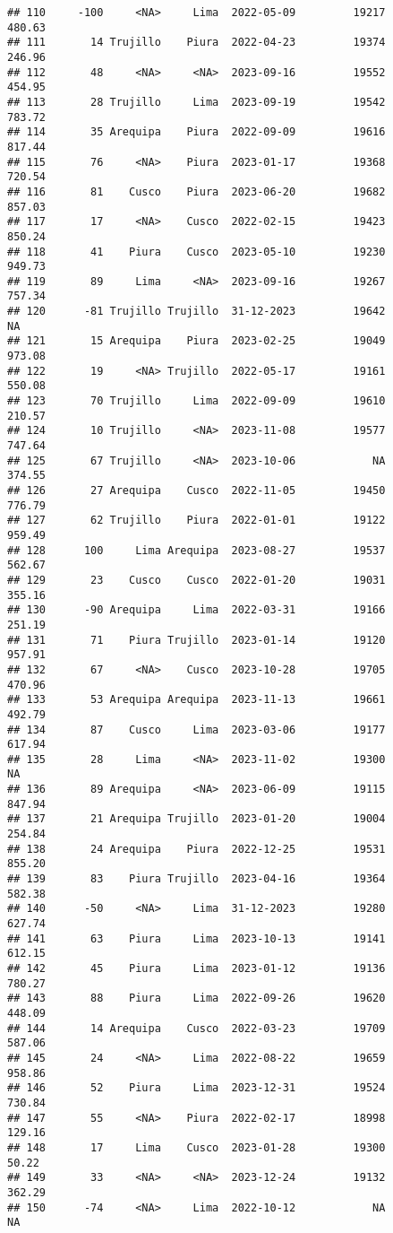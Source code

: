 \documentclass[
]{article}
\begin{document}
\begin{verbatim}
## 110     -100     <NA>     Lima  2022-05-09         19217      480.63
## 111       14 Trujillo    Piura  2022-04-23         19374      246.96
## 112       48     <NA>     <NA>  2023-09-16         19552      454.95
## 113       28 Trujillo     Lima  2023-09-19         19542      783.72
## 114       35 Arequipa    Piura  2022-09-09         19616      817.44
## 115       76     <NA>    Piura  2023-01-17         19368      720.54
## 116       81    Cusco    Piura  2023-06-20         19682      857.03
## 117       17     <NA>    Cusco  2022-02-15         19423      850.24
## 118       41    Piura    Cusco  2023-05-10         19230      949.73
## 119       89     Lima     <NA>  2023-09-16         19267      757.34
## 120      -81 Trujillo Trujillo  31-12-2023         19642          NA
## 121       15 Arequipa    Piura  2023-02-25         19049      973.08
## 122       19     <NA> Trujillo  2022-05-17         19161      550.08
## 123       70 Trujillo     Lima  2022-09-09         19610      210.57
## 124       10 Trujillo     <NA>  2023-11-08         19577      747.64
## 125       67 Trujillo     <NA>  2023-10-06            NA      374.55
## 126       27 Arequipa    Cusco  2022-11-05         19450      776.79
## 127       62 Trujillo    Piura  2022-01-01         19122      959.49
## 128      100     Lima Arequipa  2023-08-27         19537      562.67
## 129       23    Cusco    Cusco  2022-01-20         19031      355.16
## 130      -90 Arequipa     Lima  2022-03-31         19166      251.19
## 131       71    Piura Trujillo  2023-01-14         19120      957.91
## 132       67     <NA>    Cusco  2023-10-28         19705      470.96
## 133       53 Arequipa Arequipa  2023-11-13         19661      492.79
## 134       87    Cusco     Lima  2023-03-06         19177      617.94
## 135       28     Lima     <NA>  2023-11-02         19300          NA
## 136       89 Arequipa     <NA>  2023-06-09         19115      847.94
## 137       21 Arequipa Trujillo  2023-01-20         19004      254.84
## 138       24 Arequipa    Piura  2022-12-25         19531      855.20
## 139       83    Piura Trujillo  2023-04-16         19364      582.38
## 140      -50     <NA>     Lima  31-12-2023         19280      627.74
## 141       63    Piura     Lima  2023-10-13         19141      612.15
## 142       45    Piura     Lima  2023-01-12         19136      780.27
## 143       88    Piura     Lima  2022-09-26         19620      448.09
## 144       14 Arequipa    Cusco  2022-03-23         19709      587.06
## 145       24     <NA>     Lima  2022-08-22         19659      958.86
## 146       52    Piura     Lima  2023-12-31         19524      730.84
## 147       55     <NA>    Piura  2022-02-17         18998      129.16
## 148       17     Lima    Cusco  2023-01-28         19300       50.22
## 149       33     <NA>     <NA>  2023-12-24         19132      362.29
## 150      -74     <NA>     Lima  2022-10-12            NA          NA
\end{verbatim}
\end{document}
